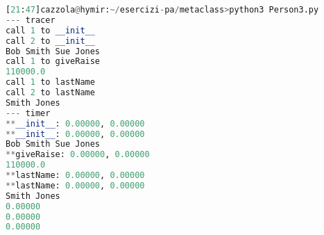 \begin{lstlisting}[language=Python]
[21:47]cazzola@hymir:~/esercizi-pa/metaclass>python3 Person3.py
--- tracer
call 1 to __init__
call 2 to __init__
Bob Smith Sue Jones
call 1 to giveRaise
110000.0
call 1 to lastName
call 2 to lastName
Smith Jones
--- timer
**__init__: 0.00000, 0.00000
**__init__: 0.00000, 0.00000
Bob Smith Sue Jones
**giveRaise: 0.00000, 0.00000
110000.0
**lastName: 0.00000, 0.00000
**lastName: 0.00000, 0.00000
Smith Jones
0.00000
0.00000
0.00000
\end{lstlisting}



